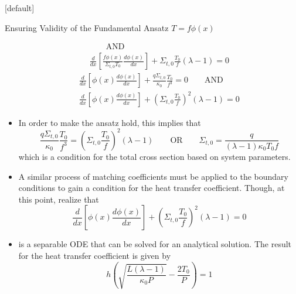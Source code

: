 \documentclass[9pt,t,aspectratio=169]{beamer}
\makeatletter
\newcommand{\QOR}{\qquad \text{OR} \qquad}
\newcommand{\QAND}{\qquad \text{AND} \qquad}
\newenvironment{withoutheadline}{
       \setbeamertemplate{headline}[default]
       \def\beamer@entrycode{\vspace*{-\headheight}}
    }{}
\makeatother
\begin{document}
\begin{withoutheadline}
\begin{frame}[allowframebreaks]{Ensuring Validity of the Fundamental Ansatz $T=f\phi(x)$}
\begin{itemize}
\begin{multline}
                \QAND \\
                \frac{d}{dx}\left\lbrack  \frac{f\phi(x)}{\Sigma_{t,0}T_{0}} \frac{d\phi(x)}{dx} \right\rbrack + \Sigma_{t,0}\frac{T_{0}}{f}
                \left(\lambda - 1\right) = 0
            \end{multline}\vspace{-0.5cm}
            \begin{multline}
                \frac{d}{dx}\left\lbrack \phi(x)\frac{d\phi(x)}{dx}\right\rbrack + \frac{q\Sigma_{t,0}}{\kappa_{0}}\frac{T_{0}}{f^3} = 0
                \QAND \\
                \frac{d}{dx}\left\lbrack \phi(x)\frac{d\phi(x)}{dx} \right\rbrack +
                \left(\Sigma_{t,0}\frac{T_{0}}{f}\right)^2 \left(\lambda - 1\right) = 0
            \end{multline}
            \item In order to make the ansatz hold, this implies that
            \begin{equation}
                \frac{q\Sigma_{t,0}}{\kappa_{0}}\frac{T_{0}}{f^3} = \left(\Sigma_{t,0}\frac{T_{0}}{f}\right)^2 \left(\lambda - 1\right)
                \QOR \Sigma_{t,0} = \frac{q}{(\lambda-1)\kappa_{0} T_{0}f}
            \end{equation}
            which is a condition for the total cross section based on system parameters.
            \item A similar process of matching coefficients
            must be applied to the boundary conditions to gain a condition for the heat transfer coefficient. Though, at this point, realize that
            \begin{equation}
                \frac{d}{dx}\left\lbrack \phi(x)\frac{d\phi(x)}{dx} \right\rbrack +
                \left(\Sigma_{t,0}\frac{T_{0}}{f}\right)^2 \left(\lambda - 1\right) = 0
            \end{equation}
            \item is a separable ODE that can be solved for an analytical solution. The result for the heat transfer coefficient is given by
            \begin{equation}
                h \left(\sqrt{\frac{L(\lambda-1)}{\kappa_{0}P}} - \frac{2T_{0}}{P} \right) = 1
            \end{equation}
        \end{itemize}
    \end{frame}
    \end{withoutheadline}
\end{document}
